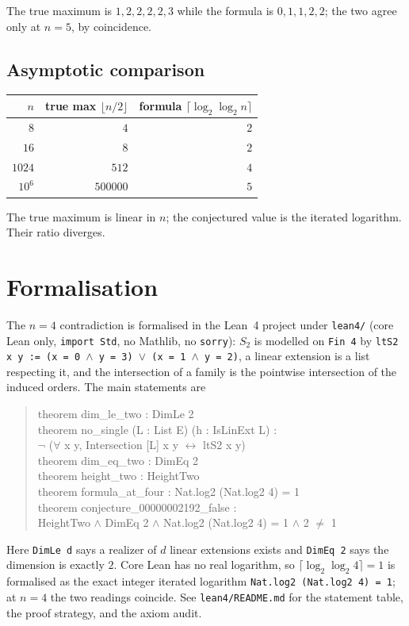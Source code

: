 \documentclass[11pt]{article}
\theoremstyle{definition}
\theoremstyle{remark}
\begin{document}
The true maximum is $1,2,2,2,2,3$ while the formula is $0,1,1,2,2$; the two
agree only at $n=5$, by coincidence.

\subsection{Asymptotic comparison}

\begin{center}
\begin{tabular}{r r r}
\toprule
$n$ & true max $\lfloor n/2\rfloor$ & formula $\lceil\log_2\log_2 n\rceil$ \\
\midrule
$8$       & $4$      & $2$ \\
$16$      & $8$      & $2$ \\
$1024$    & $512$    & $4$ \\
$10^{6}$  & $500000$ & $5$ \\
\bottomrule
\end{tabular}
\end{center}

The true maximum is linear in $n$; the conjectured value is the iterated
logarithm. Their ratio diverges.

\section{Formalisation}

The $n=4$ contradiction is formalised in the Lean~4 project under
\texttt{lean4/} (core Lean only, \texttt{import Std}, no Mathlib, no
\texttt{sorry}): $S_2$ is modelled on \texttt{Fin 4} by
\texttt{ltS2 x y := (x = 0 \(\wedge\) y = 3) \(\vee\) (x = 1 \(\wedge\) y = 2)}, a linear
extension is a list respecting it, and the intersection of a family is the
pointwise intersection of the induced orders. The main statements are
\begin{quote}\ttfamily
theorem dim\_le\_two : DimLe 2\\
theorem no\_single (L : List E) (h : IsLinExt L) :\\
\hspace*{2em}\(\neg\) (\(\forall\) x y, Intersection [L] x y \(\leftrightarrow\) ltS2 x y)\\
theorem dim\_eq\_two : DimEq 2\\
theorem height\_two : HeightTwo\\
theorem formula\_at\_four : Nat.log2 (Nat.log2 4) = 1\\
theorem conjecture\_00000002192\_false :\\
\hspace*{2em}HeightTwo \(\wedge\) DimEq 2 \(\wedge\) Nat.log2 (Nat.log2 4) = 1 \(\wedge\) 2 \(\ne\) 1
\end{quote}
Here \texttt{DimLe d} says a realizer of $d$ linear extensions exists and
\texttt{DimEq 2} says the dimension is exactly $2$. Core Lean has no real
logarithm, so $\lceil\log_2\log_2 4\rceil = 1$ is formalised as the exact
integer iterated logarithm \texttt{Nat.log2 (Nat.log2 4) = 1}; at $n=4$ the two
readings coincide. See \texttt{lean4/README.md} for the statement table, the
proof strategy, and the axiom audit.
\end{document}

